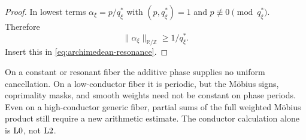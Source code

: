 \begin{proof}
In lowest terms \(\alpha_\xi=p/q_\xi^\ast\) with
\((p,q_\xi^\ast)=1\) and \(p\not\equiv0\pmod{q_\xi^\ast}\).
Therefore
\[
 \|\alpha_\xi\|_{\mathbb R/\mathbb Z}\ge1/q_\xi^\ast.
\]
Insert this in \eqref{eq:archimedean-resonance}.
\end{proof}

\begin{remark}
On a constant or resonant fiber the additive phase supplies no
uniform cancellation.  On a low-conductor fiber it is periodic, but
the M\"obius signs, coprimality masks, and smooth weights need not be
constant on phase periods.  Even on a high-conductor generic fiber,
partial sums of the full weighted M\"obius product still require a
new arithmetic estimate.  The conductor calculation alone is
\(\mathrm{L0}\), not \(\mathrm{L2}\).
\end{remark}
